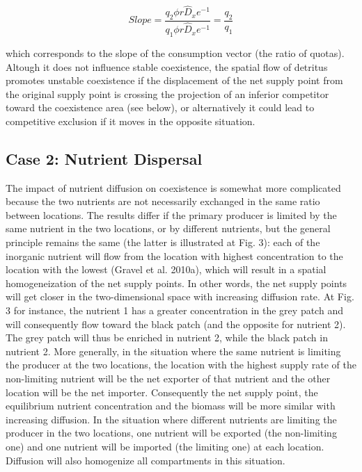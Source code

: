 \documentclass[12pt]{paper}
\begin{document}
\begin{equation}
	\label{e:bnet}
	Slope=\frac{q_{2}\phi r\widehat{D}_{x}e^{-1}}{q_{1}\phi r\widehat{D}_{x}e^{-1}}=\frac{q_{2}}{q_{1}}
\end{equation}

which corresponds to the slope of the consumption vector (the ratio of quotas). Altough it does not influence stable coexistence, the spatial flow of detritus promotes unstable coexistence if the displacement of the net supply point from the original supply point is crossing the projection of an inferior competitor toward the coexistence area (see below), or alternatively it could lead to competitive exclusion if it moves in the opposite situation. 

\subsection{Case 2: Nutrient Dispersal}

The impact of nutrient diffusion on coexistence is somewhat more complicated because the two nutrients are not necessarily exchanged in the same ratio between locations. The results differ if the primary producer is limited by the same nutrient in the two locations, or by different nutrients, but the general principle remains the same (the latter is illustrated at Fig. 3): each of the inorganic nutrient will flow from the location with highest concentration to the location with the lowest (Gravel et al. 2010a), which will result in a spatial homogeneization of the net supply points. In other words, the net supply points will get closer in the two-dimensional space with increasing diffusion rate. At Fig. 3 for instance, the nutrient 1 has a greater concentration in the grey patch and will consequently flow toward the black patch (and the opposite for nutrient 2). The grey patch will thus be enriched in nutrient 2, while the black patch in nutrient 2. More generally, in the situation where the same nutrient is limiting the producer at the two locations, the location with the highest supply rate of the non-limiting nutrient will be the net exporter of that nutrient and the other location will be the net importer. Consequently the net supply point, the equilibrium nutrient concentration and the biomass will be more similar with increasing diffusion. In the situation where different nutrients are limiting the producer in the two locations, one nutrient will be exported (the non-limiting one) and one nutrient will be imported (the limiting one) at each location. Diffusion will also homogenize all compartments in this situation. 
\end{document}
